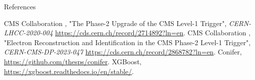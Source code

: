 \documentclass[aspectratio=169]{beamer}\usepackage[utf8]{inputenc}
\begin{document}
\begin{frame}{References}
\begin{thebibliography}{99}
 CMS Collaboration , "The Phase-2 Upgrade of the CMS Level-1 Trigger", \emph{CERN-LHCC-2020-004}
\url{https://cds.cern.ch/record/2714892?ln=en}.
 CMS Collaboration , "Electron Reconstruction and Identification in the CMS Phase-2 Level-1 Trigger", \emph{CERN-CMS-DP-2023-047}
\url{https://cds.cern.ch/record/2868782?ln=en}.
 Conifer, \url{https://github.com/thesps/conifer}.
 XGBoost, \url{https://xgboost.readthedocs.io/en/stable/}.



\end{thebibliography}


\end{frame}
\end{document}
